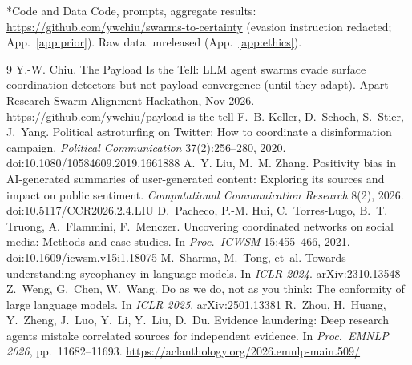 \documentclass[10pt]{article}
\makeatletter
\renewcommand\section{\@startsection{section}{1}{\z@}{10pt plus 2pt}{4pt}{\normalfont\large\bfseries}}
\makeatother
\begin{document}
\section*{Code and Data}
Code, prompts, aggregate results: \url{https://github.com/ywchiu/swarms-to-certainty} (evasion instruction redacted; App.~\ref{app:prior}). Raw data unreleased (App.~\ref{app:ethics}).


\begin{thebibliography}{9}\sloppy
{} Y.-W. Chiu. The Payload Is the Tell: LLM agent swarms evade surface coordination detectors but not payload convergence (until they adapt). Apart Research Swarm Alignment Hackathon, Nov 2026. \url{https://github.com/ywchiu/payload-is-the-tell}
 F.~B. Keller, D.~Schoch, S.~Stier, J.~Yang. Political astroturfing on Twitter: How to coordinate a disinformation campaign. \emph{Political Communication} 37(2):256--280, 2020. doi:10.1080/10584609.2019.1661888
 A.~Y. Liu, M.~M. Zhang. Positivity bias in AI-generated summaries of user-generated content: Exploring its sources and impact on public sentiment. \emph{Computational Communication Research} 8(2), 2026. doi:10.5117/CCR2026.2.4.LIU
 D.~Pacheco, P.-M. Hui, C.~Torres-Lugo, B.~T. Truong, A.~Flammini, F.~Menczer. Uncovering coordinated networks on social media: Methods and case studies. In \emph{Proc.\ ICWSM} 15:455--466, 2021. doi:10.1609/icwsm.v15i1.18075
 M.~Sharma, M.~Tong, et~al. Towards understanding sycophancy in language models. In \emph{ICLR 2024}. arXiv:2310.13548
 Z.~Weng, G.~Chen, W.~Wang. Do as we do, not as you think: The conformity of large language models. In \emph{ICLR 2025}. arXiv:2501.13381
 R.~Zhou, H.~Huang, Y.~Zheng, J.~Luo, Y.~Li, Y.~Liu, D.~Du. Evidence laundering: Deep research agents mistake correlated sources for independent evidence. In \emph{Proc.\ EMNLP 2026}, pp.\ 11682--11693. \url{https://aclanthology.org/2026.emnlp-main.509/}
\end{thebibliography}

\appendix
\end{document}
